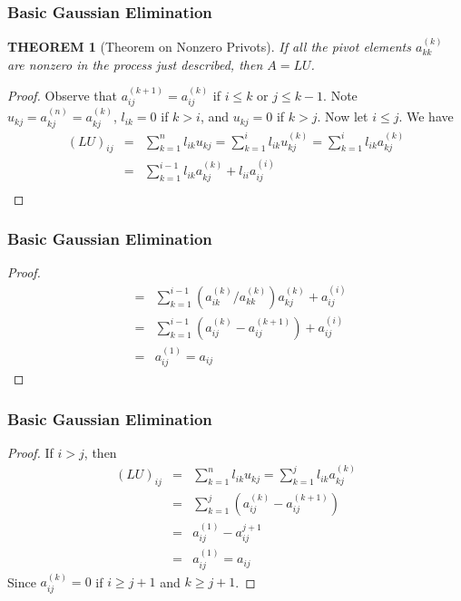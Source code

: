 \documentclass[notheorems,mathserif,table,compress]{beamer}  %
\begin{document}
\begin{frame}
\frametitle{Basic Gaussian Elimination}
\theoremstyle{plain}
\newtheorem{theorem}{THEOREM}
\begin{theorem}[Theorem on Nonzero Privots]
If all the pivot elements $a_{kk}^{(k)}$ are nonzero in the process just described, then $A=LU$.
\end{theorem}

\begin{proof}
Observe that $a_{ij}^{(k+1)}=a_{ij}^{(k)}$ if $i\leq k$ or $j\leq k-1$. Note $u_{kj}=a_{kj}^{(n)}=a_{kj}^{(k)}$, $l_{ik}=0$ if $k>i$, and $u_{kj}=0$ if $k>j$. Now let $i\leq j$. We have
\begin{eqnarray*}
(LU)_{ij}&=&\sum_{k=1}^{n}l_{ik}u_{kj}=\sum_{k=1}^{i}l_{ik}u_{kj}^{(k)}=\sum_{k=1}^{i}l_{ik}a_{kj}^{(k)}\\
&=&\sum_{k=1}^{i-1}l_{ik}a_{kj}^{(k)}+l_{ii}a_{ij}^{(i)}\\
\end{eqnarray*}

\end{proof}
\end{frame}

\begin{frame}
\frametitle{Basic Gaussian Elimination}
\begin{proof}
\begin{eqnarray*}
&=&\sum_{k=1}^{i-1}(a_{ik}^{(k)}/a_{kk}^{(k)})a_{kj}^{(k)}+a_{ij}^{(i)}\\
&=&\sum_{k=1}^{i-1}(a_{ij}^{(k)}-a_{ij}^{(k+1)})+a_{ij}^{(i)}\\
&=&a_{ij}^{(1)}=a_{ij}
\end{eqnarray*}

\end{proof}
\end{frame}

\begin{frame}
\frametitle{Basic Gaussian Elimination}
\begin{proof} 
If $i>j$, then 
\begin{eqnarray*}
(LU)_{ij}&=&\sum_{k=1}^{n}l_{ik}u_{kj}=\sum_{k=1}^{j}l_{ik}a_{kj}^{(k)}\\
&=&\sum_{k=1}^{j}(a_{ij}^{(k)}-a_{ij}^{(k+1)})\\
&=&a_{ij}^{(1)}-a_{ij}^{j+1}\\
&=&a_{ij}^{(1)}=a_{ij}
\end{eqnarray*}
Since $a_{ij}^{(k)}=0$ if $i\geq j+1$ and $k\geq j+1$.
\end{proof}

\end{frame}
\end{document}
